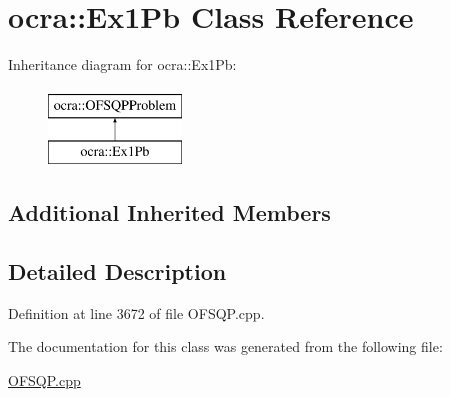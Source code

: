 \hypertarget{classocra_1_1Ex1Pb}{}\section{ocra\+:\+:Ex1\+Pb Class Reference}
\label{classocra_1_1Ex1Pb}
Inheritance diagram for ocra\+:\+:Ex1\+Pb\+:\begin{figure}[H]
\begin{center}
\leavevmode
\includegraphics[height=2.000000cm]{d5/d80/classocra_1_1Ex1Pb}
\end{center}
\end{figure}
\subsection*{Additional Inherited Members}


\subsection{Detailed Description}


Definition at line 3672 of file O\+F\+S\+Q\+P.\+cpp.



The documentation for this class was generated from the following file\+:\begin{DoxyCompactItemize}
\item 
\hyperlink{OFSQP_8cpp}{O\+F\+S\+Q\+P.\+cpp}\end{DoxyCompactItemize}
